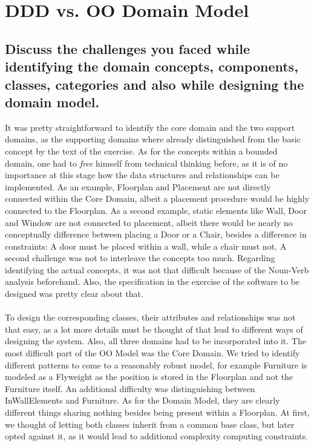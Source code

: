 \section{DDD vs. OO Domain Model}
		
		\subsection{Discuss the challenges you faced while identifying the domain concepts,
			components, classes, categories and also while designing the domain model.}
		
		It was pretty straightforward to identify the core domain and the two support domains, as the supporting domains where already distinguished from the basic concept by the text of the exercise.
		As for the concepts within a bounded domain, one had to \textit{free} himself from technical thinking before, as it is of no importance at this stage how the data structures and relationships can be implemented.
		As an example, Floorplan and Placement are not directly connected within the Core Domain, albeit a placement procedure would be highly connected to the Floorplan.
		As a second example, static elements like Wall, Door and Window are not connected to placement, albeit there would be nearly no conceptually difference between placing a Door or a Chair, besides a difference in constraints: A door must be placed within a wall, while a chair must not.
		A second challenge was not to interleave the concepts too much.
		Regarding identifying the actual concepts, it was not that difficult because of the Noun-Verb analysis beforehand.
		Also, the specification in the exercise of the software to be designed was pretty clear about that.
		\\ \ \\
		To design the corresponding classes, their attributes and relationships was not that easy, as a lot more details must be thought of that lead to different ways of designing the system.
		Also, all three domains had to be incorporated into it.
		The most difficult part of the OO Model was the Core Domain.
		We tried to identify different patterns to come to a reasonably robust model, for example Furniture is modeled as a Flyweight as the position is stored in the Floorplan and not the Furniture itself.
		An additional difficulty was distinguishing between InWallElements and Furniture.
		As for the Domain Model, they are clearly different things sharing nothing besides being present within a Floorplan.
		At first, we thought of letting both classes inherit from a common base class, but later opted against it, as it would lead to additional complexity computing constraints.

